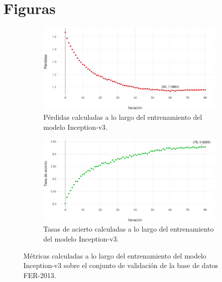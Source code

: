 \chapter{Figuras} \label{Appendix:Figures}


\begin{figure}
   \vspace{1cm}
    \begin{subfigure}[t]{\textwidth}
      \centering
      \includegraphics[width=\linewidth]{Images/Inception-v3_loss.png}
      \caption{Pérdidas calculadas a lo largo del entrenamiento del modelo Inception-v3.}
      \label{fig:Inception-v3_loss}
    \end{subfigure}
    
    \vspace{1cm}
    \begin{subfigure}[t]{\textwidth}
      \centering
      \includegraphics[width=\linewidth]{Images/Inception-v3_acc.png}
      \caption{Tasas de acierto calculadas a lo largo del entrenamiento del modelo Inception-v3.}
      \label{fig:Inception-v3_acc}
    \end{subfigure}
    \caption{Métricas calculadas a lo largo del entrenamiento del modelo Inception-v3 sobre el conjunto de validación de la base de datos FER-2013.}
    \label{fig:Inception-v3_metrics}
\end{figure}

